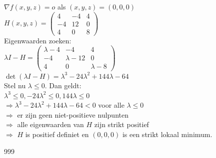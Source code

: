 \documentclass[a4paper]{article}
\begin{document}
$\nabla f(x, y, z) = o$ als $(x, y, z) = (0, 0, 0)$ \\

$H(x, y, z) = \left(\begin{array}{ccc}
    4  & -4 & 4 \\
    -4 & 12 & 0 \\
    4  & 0  & 8
\end{array}\right)$ \\

Eigenwaarden zoeken: \\

$\lambda I - H = \left(\begin{array}{ccc}
    \lambda - 4 & -4           & 4           \\
    -4          & \lambda - 12 & 0           \\
    4           & 0            & \lambda - 8
\end{array}\right)$ \\

$\det(\lambda I - H) = \lambda^{3} - 24\lambda^{2} + 144\lambda - 64$ \\


Stel nu $\lambda \leq 0$. Dan geldt: \\


$\lambda^3 \leq 0, -24\lambda^2 \leq 0,
144\lambda \leq 0$ \\

$\Rightarrow \lambda^{3} - 24\lambda^{2} + 144\lambda - 64 < 0$ voor alle $\lambda \leq 0$ \\

$\Rightarrow$ er zijn geen niet-positieve nulpunten \\

$\Rightarrow$ alle eigenwaarden van $H$ zijn strikt positief \\

$\Rightarrow$ $H$ is positief definiet en $(0,0,0)$ is een strikt lokaal minimum. \\




\begin{thebibliography}{999}
\end{thebibliography}
\end{document}
